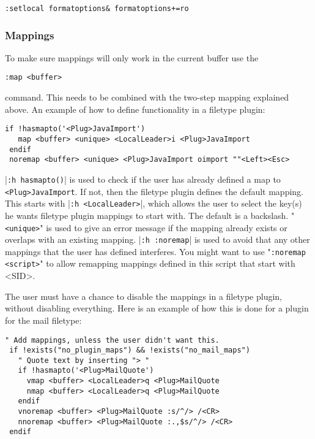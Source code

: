 \begin{Verbatim}[samepage=true]
 :setlocal formatoptions& formatoptions+=ro
\end{Verbatim}

\subsubsection{Mappings}
To make sure mappings will only work in the current buffer use the

\begin{Verbatim}[samepage=true]
 :map <buffer>
\end{Verbatim}

command.
This needs to be combined with the two-step mapping explained above.
An example of how to define functionality in a filetype plugin:

\begin{Verbatim}[samepage=true]
 if !hasmapto('<Plug>JavaImport')
   map <buffer> <unique> <LocalLeader>i <Plug>JavaImport
 endif
 noremap <buffer> <unique> <Plug>JavaImport oimport ""<Left><Esc>
\end{Verbatim}

|\verb!:h hasmapto()!| is used to check if the user has already defined a map to \verb!<Plug>JavaImport!.
If not, then the filetype plugin defines the default mapping.
This starts with |\verb!:h <LocalLeader>!|, which allows the user to select the key(s) he wants filetype plugin mappings to start with.
The default is a backslash.
"\verb!<unique>!" is used to give an error message if the mapping already exists or overlaps with an existing mapping.
|\verb!:h :noremap!| is used to avoid that any other mappings that the user has defined interferes.
You might want to use "\verb!:noremap <script>!" to allow remapping mappings defined in this script that start with <SID>.

The user must have a chance to disable the mappings in a filetype plugin, without disabling everything.
Here is an example of how this is done for a plugin for the mail filetype:

\begin{Verbatim}[samepage=true]
 " Add mappings, unless the user didn't want this.
 if !exists("no_plugin_maps") && !exists("no_mail_maps")
   " Quote text by inserting "> "
   if !hasmapto('<Plug>MailQuote')
     vmap <buffer> <LocalLeader>q <Plug>MailQuote
     nmap <buffer> <LocalLeader>q <Plug>MailQuote
   endif
   vnoremap <buffer> <Plug>MailQuote :s/^/> /<CR>
   nnoremap <buffer> <Plug>MailQuote :.,$s/^/> /<CR>
 endif
\end{Verbatim}

